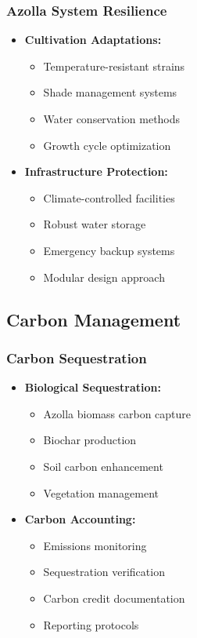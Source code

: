 \subsubsection{Azolla System Resilience}
\begin{itemize}
    \item \textbf{Cultivation Adaptations:}
    \begin{itemize}
        \item Temperature-resistant strains
        \item Shade management systems
        \item Water conservation methods
        \item Growth cycle optimization
    \end{itemize}
    
    \item \textbf{Infrastructure Protection:}
    \begin{itemize}
        \item Climate-controlled facilities
        \item Robust water storage
        \item Emergency backup systems
        \item Modular design approach
    \end{itemize}
\end{itemize}

\subsection{Carbon Management}

\subsubsection{Carbon Sequestration}
\begin{itemize}
    \item \textbf{Biological Sequestration:}
    \begin{itemize}
        \item Azolla biomass carbon capture
        \item Biochar production
        \item Soil carbon enhancement
        \item Vegetation management
    \end{itemize}
    
    \item \textbf{Carbon Accounting:}
    \begin{itemize}
        \item Emissions monitoring
        \item Sequestration verification
        \item Carbon credit documentation
        \item Reporting protocols
    \end{itemize}
\end{itemize}

